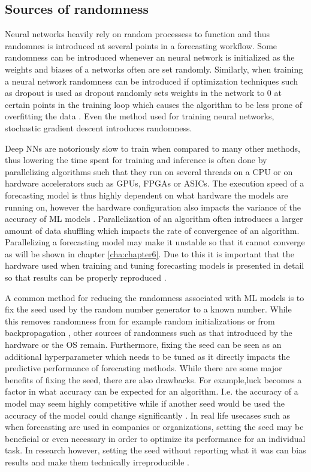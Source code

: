 \subsection{Sources of randomness}
\label{subsec:sources_randomness}
Neural networks heavily rely on random processess to function and thus randomnes is introduced at several points in a forecasting workflow. Some randomness can be introduced whenever an neural network is initialized as the weights and biases of a networks often are set randomly. Similarly, when training a neural network randomness can be introduced if optimization techniques such as dropout is used as dropout randomly sets weights in the network to 0 at certain points in the training loop which causes the algorithm to be less prone of overfitting the data \cite{srivastava_dropout_2014}. Even the method used for training neural networks, stochastic gradient descent introduces randomness.

Deep NNs are notoriously slow to train when compared to many other methods, thus lowering the time spent for training and inference is often done by parallelizing algorithms such that they run on several threads on a CPU or on hardware accelerators such as GPUs, FPGAs or ASICs. The execution speed of a forecasting model is thus highly dependent on what hardware the models are running on, however the hardware configuration also impacts the variance of the accuracy of ML models \cite{zhuang2021randomness}. Parallelization of an algorithm often introduces a larger amount of data shuffling which impacts the rate of convergence of an algorithm. Parallelizing a forecasting model may make it unstable so that it cannot converge as will be shown in chapter \ref{cha:chapter6}. Due to this it is important that the hardware used when training and tuning forecasting models is presented in detail so that results can be properly reproduced \cite{pineau2020improving}.

A common method for reducing the randomness associated with ML models is to fix the seed used by the random number generator to a known number. While this removes randomness from for example random initializations or from backpropagation \cite{beam2020challenges}, other sources of randomness such as that introduced by the hardware or the OS remain. Furthermore, fixing the seed can be seen as an additional hyperparameter which needs to be tuned as it directly impacts the predictive performance of forecasting methods. While there are some major benefits of fixing the seed, there are also drawbacks. For example,luck becomes a factor in what accuracy can be expected for an algorithm. I.e. the accuracy of a model may seem highly competitive while if another seed would be used the accuracy of the model could change significantly \cite{beam2020challenges}. In real life usecases such as when forecasting are used in companies or organizations, setting the seed may be beneficial or even necessary in order to optimize its performance for an individual task. In research however, setting the seed without reporting what it was can bias results and make them technically irreproducible \cite{beam2020challenges,pineau2020improving,bouthillier2021accounting}.

